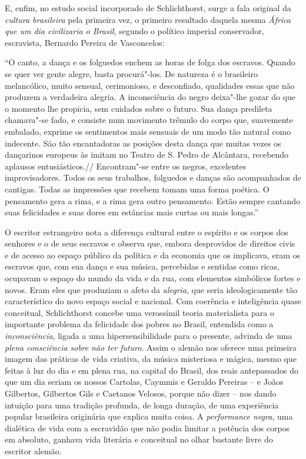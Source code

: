 E, enfim, no estudo social incorporado de Schlichthorst, surge a fala
original da \emph{cultura brasileira} pela primeira vez, o primeiro
resultado daquela mesma \emph{África que um dia civilizaria o Brasil},
segundo o político imperial conservador, escravista, Bernardo Pereira de
Vasconcelos:

``O canto, a dança e os folguedos enchem as horas de folga dos escravos.
Quando se quer ver gente alegre, basta procurá"-los. De natureza é o
brasileiro melancólico, muito sensual, cerimonioso, e desconfiado,
qualidades essas que não produzem a verdadeira alegria. A inconsciência
do negro deixa"-lhe gozar do que o momento lhe propicia, sem cuidados
sobre o futuro. Sua dança predileta chamava"-se fado, e consiste num
movimento trêmulo do corpo que, suavemente embalado, exprime os
sentimentos mais sensuais de um modo tão natural como indecente. São tão
encantadoras as posições desta dança que muitas vezes os dançarinos
europeus às imitam no Teatro de S. Pedro de Alcântara, recebendo
aplausos entusiásticos.// Encontram"-se entre os negros, excelentes
improvisadores. Todos os seus trabalhos, folguedos e danças são
acompanhados de cantigas. Todas as impressões que recebem tomam uma
forma poética. O pensamento gera a rima, e a rima gera outro pensamento.
Estão sempre cantando suas felicidades e suas dores em estâncias mais
curtas ou mais longas.''

O escritor estrangeiro nota a diferença cultural entre o espírito e os
corpos dos senhores e o de seus escravos e observa que, embora
desprovidos de direitos civis e de acesso ao espaço público da política
e da economia que os implicava, eram os escravos que, com sua dança e
sua música, percebidas e sentidas como ricas, ocupavam o espaço do mundo
da vida e da rua, com elementos simbólicos fortes e novos. Eram eles que
produziam o afeto da \emph{alegria}, que seria ideologicamente tão
característico do novo espaço social e nacional. Com coerência e
inteligência quase conceitual, Schlichthorst concebe uma verossímil
teoria materialista para o importante problema da felicidade dos pobres
no Brasil, entendida como a \emph{inconsciência}, ligada a uma
hipersensibilidade para o presente, advinda de uma \emph{plena
consciência} \emph{sobre} \emph{não ter futuro}. Assim o alemão nos
oferece uma primeira imagem das práticas de vida criativa, da música
misteriosa e mágica, mesmo que feitas à luz do dia e em plena rua, na
capital do Brasil, dos reais antepassados do que um dia seriam os nossos
Cartolas, Caymmis e Geraldo Pereiras -- e Joãos Gilbertos, Gilbertos
Gils e Caetanos Velosos, porque não dizer -- nos dando intuição para uma
tradição profunda, de longa duração, de uma experiência popular
brasileira originária que explica muita coisa. A \emph{performance
negra}, uma dialética de vida com a escravidão que não podia limitar a
potência dos corpos em absoluto, ganhava vida literária e conceitual no
olhar bastante livre do escritor alemão.


